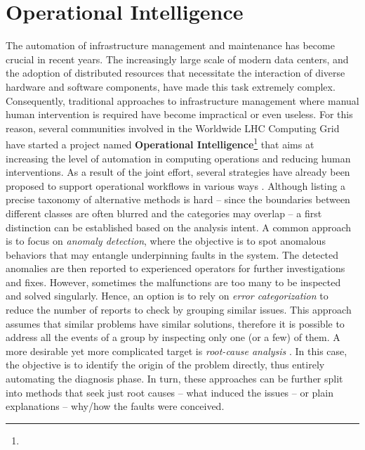 \chapter{Operational Intelligence} \label{ch:opint}
The automation of infrastructure management and maintenance has become crucial in recent years. 
The increasingly large scale of modern data centers, and the adoption of distributed resources that necessitate the interaction of diverse hardware and software components, have made this task extremely complex. Consequently, traditional approaches to infrastructure management where manual human intervention is required have become impractical or even useless. 
For this reason, several communities involved in the Worldwide LHC Computing Grid have started a project named \textbf{Operational Intelligence}\footnote{\opint} that aims at increasing the level of automation in computing operations and reducing human interventions.
As a result of the joint effort, 
several strategies have already been proposed to support operational workflows in various ways \cite{opint2020, opint2022, decker2020powerquality, diotalevi2019elk}.
Although listing a precise taxonomy of alternative methods is hard -- since the boundaries between different classes are often blurred and the categories may overlap -- a first distinction can be established based on the analysis intent.
A common approach is to focus on \textit{anomaly detection}, where the objective is to spot anomalous behaviors that may entangle underpinning faults in the system. The detected anomalies are then reported to experienced operators for further investigations and fixes.
However, sometimes the malfunctions are too many to be inspected and solved singularly. Hence, an option is to rely on \textit{error categorization} to reduce the number of reports to check by grouping similar issues. This approach assumes that similar problems have similar solutions, therefore it is possible to address all the events of a group by inspecting only one (or a few) of them.
A more desirable yet more complicated target is \textit{root-cause analysis} \cite{sole2017survey}. In this case, the objective is to identify the origin of the problem directly, thus entirely automating the diagnosis phase.
In turn, these approaches can be further split into methods that seek just root causes -- what induced the issues -- or plain explanations -- why/how the faults were conceived.

